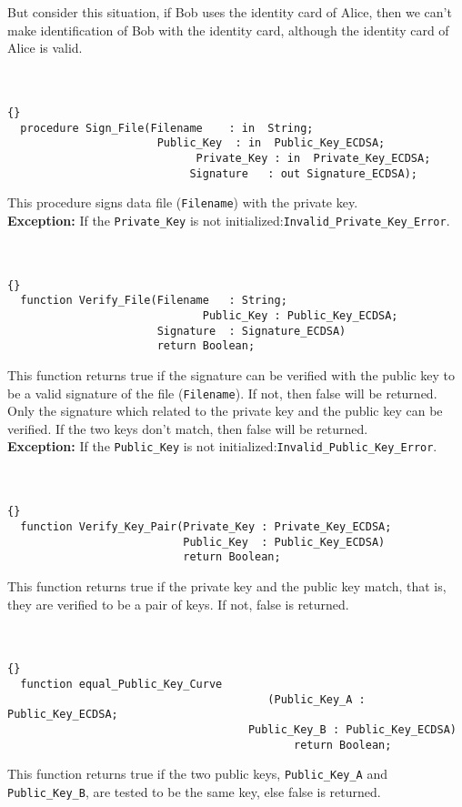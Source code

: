 But consider this situation, if Bob uses the identity card of Alice, then we can't make identification of Bob with the identity card, although the identity card of Alice is valid.\\
\hline \\ \ \\
\begin{lstlisting}{}
  procedure Sign_File(Filename    : in  String;
          		       Public_Key  : in  Public_Key_ECDSA;
					     	 Private_Key : in  Private_Key_ECDSA;
						    Signature   : out Signature_ECDSA);
\end{lstlisting}
This procedure signs data file (\texttt{Filename}) with the private key.\\
\textbf{Exception:}
If the \texttt{Private\_Key} is not initialized:\quad \texttt{Invalid\_Private\_Key\_Error}.\\
\hline \\ \ \\
\begin{lstlisting}{}
  function Verify_File(Filename   : String;
					 		  Public_Key : Public_Key_ECDSA;
                       Signature  : Signature_ECDSA) 
                       return Boolean;
\end{lstlisting}
This function returns true if the signature can be verified with the public key to be a valid signature of the file (\texttt{Filename}). If not, then false will be returned.\\
Only the signature which related to the private key and the public key can be verified. If the two keys don't match, then false will be returned.\\
\textbf{Exception:}
If the \texttt{Public\_Key} is not initialized:\quad \texttt{Invalid\_Public\_Key\_Error}.\\
\hline \\ \ \\
\begin{lstlisting}{}
  function Verify_Key_Pair(Private_Key : Private_Key_ECDSA;
                           Public_Key  : Public_Key_ECDSA) 
                           return Boolean;
\end{lstlisting}
This function returns true if the private key and the public key match, that is, they are verified to be a pair of keys. If not, false is returned.\\
\hline \\ \ \\
\begin{lstlisting}{}
  function equal_Public_Key_Curve
  					  					(Public_Key_A : Public_Key_ECDSA;
		              				 Public_Key_B : Public_Key_ECDSA) 	
								 			return Boolean;
\end{lstlisting}
This function returns true if the two public keys, \texttt{Public\_Key\_A} and \texttt{Public\_Key\_B}, are tested to be the same key, else false is returned.\\
